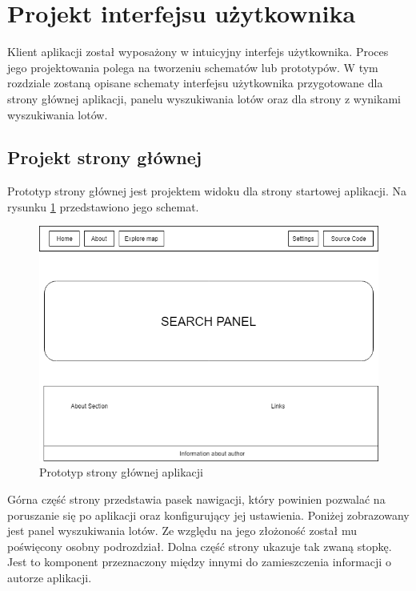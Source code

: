 \documentclass[12pt, twoside]{report}
\begin{document}
\section{Projekt interfejsu użytkownika}
Klient aplikacji został wyposażony w intuicyjny interfejs użytkownika. Proces jego projektowania polega na tworzeniu schematów lub prototypów. W tym rozdziale zostaną opisane schematy interfejsu użytkownika przygotowane dla strony głównej aplikacji, panelu wyszukiwania lotów oraz dla strony z wynikami wyszukiwania lotów.
\subsection{Projekt strony głównej}
Prototyp strony głównej jest projektem widoku dla strony startowej aplikacji. Na rysunku \ref{fig:main_page_schema} przedstawiono jego schemat.

\begin{figure}[!ht]
\centering
\includegraphics[scale=0.50, keepaspectratio]{main_page_interface_project.PNG}
\caption{Prototyp strony głównej aplikacji}
\label{fig:main_page_schema}
\end{figure}

Górna część strony przedstawia pasek nawigacji, który powinien pozwalać na poruszanie się po aplikacji oraz konfigurujący jej ustawienia. Poniżej zobrazowany jest panel wyszukiwania lotów. Ze względu na jego złożoność został mu poświęcony osobny podrozdział. Dolna część strony ukazuje tak zwaną stopkę. Jest to komponent przeznaczony między innymi do zamieszczenia informacji o autorze aplikacji.
\end{document}
